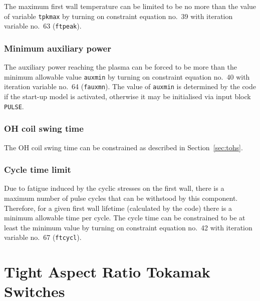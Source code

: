 \documentclass[11pt,a4paper]{report}
\begin{document}
The maximum first wall temperature can be limited to be no more than the value
of variable {\tt tpkmax} by turning on constraint equation no.\ 39 with
iteration variable no.\ 63 ({\tt ftpeak}).

\subsubsection{Minimum auxiliary power}

The auxiliary power reaching the plasma can be forced to be more than the
minimum allowable value {\tt auxmin} by turning on constraint equation no.\ 40
with iteration variable no.\ 64 ({\tt fauxmn}). The value of {\tt auxmin} is
determined by the code if the start-up model is activated, otherwise it may be
initialised via input block {\tt PULSE}.

\subsubsection{OH coil swing time}

The OH coil swing time can be constrained as described in
Section~\ref{sec:tohs}.

\subsubsection{Cycle time limit}

Due to fatigue induced by the cyclic stresses on the first wall, there is a
maximum number of pulse cycles that can be withstood by this component.
Therefore, for a given first wall lifetime (calculated by the code) there is a
minimum allowable time per cycle. The cycle time can be constrained to be at
least the minimum value by turning on constraint equation no.\ 42 with
iteration variable no.\ 67 ({\tt ftcycl}).

\section{Tight Aspect Ratio Tokamak Switches}
\end{document}
